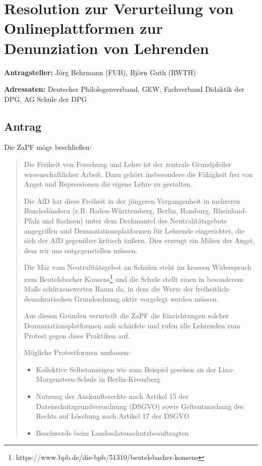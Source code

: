 \documentclass[draft,10pt,oneside]{scrartcl}
\begin{document}
\section*{Resolution zur Verurteilung von Onlineplattformen zur Denunziation
von Lehrenden}

\textbf{Antragsteller:} Jörg Behrmann (FUB), Björn Guth (RWTH)

\textbf{Adressaten:} Deutscher Philologenverband, GEW, Fachverband Didaktik der
DPG, AG Schule der DPG

\subsection*{Antrag}

Die ZaPF möge beschließen:

\begin{quote} Die Freiheit von Forschung und Lehre ist der zentrale
    Grundpfeiler wissenschaftlicher Arbeit. Dazu gehört insbesondere die
    Fähigkeit frei von Angst und Repressionen die eigene Lehre zu gestalten.

    Die AfD hat diese Freiheit in der jüngeren Vergangenheit in mehreren
    Bundesländern (z.B. Baden-Württemberg, Berlin, Hamburg, Rheinland-Pfalz und
    Sachsen) unter dem Deckmantel des Neutralitätsgebots angegriffen und
    Denunziationsplatformen für Lehrende eingerichtet, die sich der AfD
    gegenüber kritisch äußern. Dies erzeugt ein Milieu der Angst, dem wir uns
    entgegenstellen müssen.

    Die Mär vom Neutralitätsgebot an Schulen steht im krassen Widerspruch zum
    Beutelsbacher
    Konsens\footnote{https://www.bpb.de/die-bpb/51310/beutelsbacher-konsens}
    und die Schule stellt einen in besonderem Maße schützenswerten Raum da, in
    dem die Werte der freiheitlich-demokratischen Grundordnung aktiv vorgelegt
    werden müssen.

    Aus diesen Gründen verurteilt die ZaPF die Einrichtungen solcher
    Denunziationsplatformen aufs schärfste und rufen alle Lehrenden zum Protest
    gegen diese Praktiken auf.

    Mögliche Protestformen umfassen:

    \begin{itemize} \item Kollektive Selbstanzeigen wie zum Beispiel gesehen an
        der Lina-Morgenstern-Schule in Berlin-Kreuzberg \item Nutzung der
        Auskunftsrechte nach Artikel 15 der Datenschutzgrundverordnung (DSGVO)
        sowie Geltentmachung des Rechts auf Löschung nach Artikel 17 der DSGVO
        \item Beschwerde beim Landesdatenschutzbeauftragten \end{itemize}
\end{quote}
\end{document}

